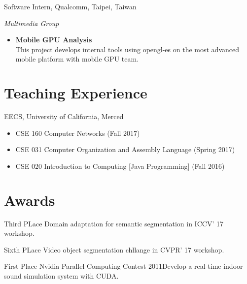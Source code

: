 \documentclass[11pt,letterpaper,sans]{moderncv} %
\begin{document}
%
{Software Intern, Qualcomm, Taipei, Taiwan}
{}{}{}
{
	\textit{Multimedia Group}
	\begin{itemize}
		\item \textbf{Mobile GPU Analysis} \\
		This project develops internal tools using opengl-es on the most advanced mobile platform with mobile GPU team.
	\end{itemize}
}





\section{Teaching Experience}

%
{EECS, University of California, Merced}
{}{}{}
{
\begin{itemize}
	\item CSE 160 Computer Networks (Fall 2017)
	\item CSE 031 Computer Organization and Assembly Language (Spring 2017)
	\item CSE 020 Introduction to Computing [Java Programming] (Fall 2016)
\end{itemize}
}


\section{Awards}

{Third PLace}{}
{}{}{Domain adaptation for semantic segmentation in ICCV' 17 workshop.}

{Sixth PLace}{}
{}{}{Video object segmentation chllange in CVPR' 17 workshop. }

{First Place}{}
{Nvidia Parallel Computing Contest 2011}{}{Develop a real-time indoor sound simulation system with CUDA.}
\end{document}

